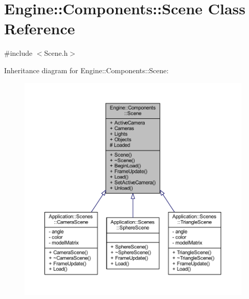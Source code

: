 \hypertarget{classEngine_1_1Components_1_1Scene}{}\section{Engine\+:\+:Components\+:\+:Scene Class Reference}
\label{classEngine_1_1Components_1_1Scene}


{\ttfamily \#include $<$Scene.\+h$>$}



Inheritance diagram for Engine\+:\+:Components\+:\+:Scene\+:
\nopagebreak
\begin{figure}[H]
\begin{center}
\leavevmode
\includegraphics[width=350pt]{classEngine_1_1Components_1_1Scene__inherit__graph}
\end{center}
\end{figure}


